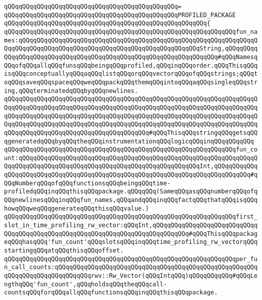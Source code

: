\verb|qQQqqQQqqQQqqQQqqQQqqQQqqQQqqQQqqQQqqQQqqQQqqQQq=|\newline
\verb|qQQqqQQqqQQqqQQqqQQqqQQqqQQqqQQqqQQqqQQqqQQqqQQqPROFILED_PACKAGE|\newline
\verb|qQQqqQQqqQQqqQQqqQQqqQQqqQQqqQQqqQQqqQQqqQQqqQQqqQQqqQQq{|\newline
\verb|qQQqqQQqqQQqqQQqqQQqqQQqqQQqqQQqqQQqqQQqqQQqqQQqqQQqqQQqqQQqqQQqfun_names:qQQqqQQqqQQqqQQqqQQqqQQqqQQqqQQqqQQqqQQqqQQqqQQqqQQqqQQqqQQqqQQqqQQqqQQqqQQqqQQqqQQqqQQqqQQqqQQqqQQqqQQqqQQqqQQqqQQqqQQqString,qQQqqQQqqQQqqQQqqQQqqQQqqQQqqQQqqQQqqQQqqQQqqQQqqQQqqQQqqQQqqQQqqQQq#qQQqNamesqQQqofqQQqallqQQqfunsqQQqbeingqQQqprofiled,qQQqinqQQqorder.qQQqThisqQQqisqQQqconceptuallyqQQqaqQQqlistqQQqorqQQqvectorqQQqofqQQqstrings;qQQqtoqQQqsaveqQQqspaceqQQqweqQQqpackqQQqthemqQQqintoqQQqaqQQqsingleqQQqstring,qQQqterminatedqQQqbyqQQqnewlines.|\newline
\verb|qQQqqQQqqQQqqQQqqQQqqQQqqQQqqQQqqQQqqQQqqQQqqQQqqQQqqQQqqQQqqQQqqQQqqQQqqQQqqQQqqQQqqQQqqQQqqQQqqQQqqQQqqQQqqQQqqQQqqQQqqQQqqQQqqQQqqQQqqQQqqQQqqQQqqQQqqQQqqQQqqQQqqQQqqQQqqQQqqQQqqQQqqQQqqQQqqQQqqQQqqQQqqQQqqQQqqQQqqQQqqQQqqQQqqQQqqQQqqQQqqQQqqQQqqQQqqQQqqQQqqQQqqQQqqQQqqQQqqQQqqQQqqQQqqQQqqQQqqQQqqQQqqQQqqQQqqQQqqQQq#qQQqThisqQQqstringqQQqgetsqQQqgeneratedqQQqbyqQQqtheqQQqinstrumentationqQQqlogicqQQqinqQQqqQQqqQQq|\newline
\verb|qQQqqQQqqQQqqQQqqQQqqQQqqQQqqQQqqQQqqQQqqQQqqQQqqQQqqQQqqQQqqQQqfun_count:qQQqqQQqqQQqqQQqqQQqqQQqqQQqqQQqqQQqqQQqqQQqqQQqqQQqqQQqqQQqqQQqqQQqqQQqqQQqqQQqqQQqqQQqqQQqqQQqqQQqqQQqqQQqqQQqqQQqqQQqInt,qQQqqQQqqQQqqQQqqQQqqQQqqQQqqQQqqQQqqQQqqQQqqQQqqQQqqQQqqQQqqQQqqQQqqQQqqQQqqQQq#qQQqNumberqQQqofqQQqfunctionsqQQqbeingqQQqtime-profiledqQQqinqQQqthisqQQqpackage.qQQqqQQq(SameqQQqasqQQqnumberqQQqofqQQqnewlinesqQQqinqQQqfun_names,qQQqandqQQqinqQQqfactqQQqthatqQQqisqQQqhowqQQqweqQQqgenerateqQQqthisqQQqvalue.)|\newline
\verb|qQQqqQQqqQQqqQQqqQQqqQQqqQQqqQQqqQQqqQQqqQQqqQQqqQQqqQQqqQQqqQQqfirst_slot_in_time_profiling_rw_vector:qQQqInt,qQQqqQQqqQQqqQQqqQQqqQQqqQQqqQQqqQQqqQQqqQQqqQQqqQQqqQQqqQQqqQQqqQQqqQQqqQQqqQQq#qQQqThisqQQqpackageqQQqhasqQQq'fun_count'qQQqslotsqQQqinqQQqtime_profiling_rw_vectorqQQqstartingqQQqatqQQqthisqQQqoffset.|\newline
\verb|qQQqqQQqqQQqqQQqqQQqqQQqqQQqqQQqqQQqqQQqqQQqqQQqqQQqqQQqqQQqqQQqper_fun_call_counts:qQQqqQQqqQQqqQQqqQQqqQQqqQQqqQQqqQQqqQQqqQQqqQQqqQQqqQQqqQQqqQQqqQQqqQQqqQQqqQQqrwv::Rw_Vector(qQQqIntqQQq)qQQqqQQqqQQq#qQQqLengthqQQq'fun_count',qQQqholdsqQQqtheqQQqcall-countsqQQqforqQQqallqQQqfunctionsqQQqinqQQqthisqQQqpackage.|\newline
